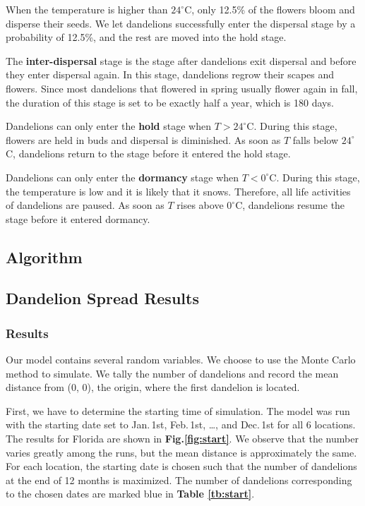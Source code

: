 \documentclass[12pt]{article}
\begin{document}
		When the temperature is higher than $24^\circ$C, only 12.5\% of the flowers bloom and disperse their seeds.  We let dandelions successfully enter the dispersal stage by a probability of 12.5\%, and the rest are moved into the hold stage.
		
		The \textbf{inter-dispersal} stage is the stage after dandelions exit dispersal and before they enter dispersal again.  In this stage, dandelions regrow their scapes and flowers.  Since most dandelions that flowered in spring usually flower again in fall, the duration of this stage is set to be exactly half a year, which is 180 days.  
		
		Dandelions can only enter the \textbf{hold} stage when $T > 24^\circ$C.  During this stage, flowers are held in buds and dispersal is diminished.  As soon as $T$ falls below $24^\circ$C, dandelions return to the stage before it entered the hold stage.  
		
		Dandelions can only enter the \textbf{dormancy} stage when $T < 0^\circ$C.  During this stage, the temperature is low and it is likely that it snows.  Therefore, all life activities of dandelions are paused.  As soon as $T$ rises above $0^\circ$C, dandelions resume the stage before it entered dormancy.
		
		
		
		
		
	\subsection{Algorithm}
	
	\subsection{Dandelion Spread Results}
	
		\subsubsection{Results}
		
			Our model contains several random variables.  We choose to use the Monte Carlo method to simulate.  We tally the number of dandelions and record the mean distance from (0, 0), the origin, where the first dandelion is located.
			
			First, we have to determine the starting time of simulation.  The model was run with the starting date set to Jan.\,1st, Feb.\,1st, \ldots, and Dec.\,1st for all 6 locations.  The results for Florida are shown in \textbf{Fig.\ref{fig:start}}.  We observe that the number varies greatly among the runs, but the mean distance is approximately the same.  For each location, the starting date is chosen such that the number of dandelions at the end of 12 months is maximized.  The number of dandelions corresponding to the chosen dates are marked blue in \textbf{Table \ref{tb:start}}.
			
\end{document}
